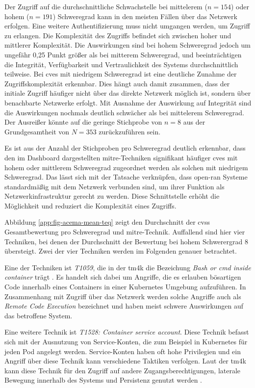 \par Der Zugriff auf die durchschnittliche Schwachstelle bei mittelerem (\(n = 154\)) oder hohem (\(n = 191\)) Schweregrad kann in den meisten Fällen über das Netzwerk erfolgen. Eine weitere Authentifizierung muss nicht umgangen werden, um Zugriff zu erlangen. Die Komplexität des Zugriffs befindet sich zwischen hoher und mittlerer Komplexität. Die Auswirkungen sind bei hohem Schweregrad jedoch um ungefähr 0,25 Punkt größer als bei mitterem Schweregrad, und beeinträchtigen die Integrität, Verfügbarkeit und Vertraulichkeit des Systems durchschnittlich teilweise. Bei \glspl{cve} mit niedrigem Schweregrad ist eine deutliche Zunahme der Zugriffskomplexität erkennbar. Dies hängt auch damit zusammen, dass der initiale Zugriff häufiger nicht über das direkte Netzwerk möglich ist, sondern über benachbarte Netzwerke erfolgt. Mit Ausnahme der Auswirkung auf Integrität sind die Auswirkungen nochmals deutlich schwächer als bei mittelerem Schweregrad. Der Ausreißer könnte auf die geringe Stichprobe von \(n = 8\) aus der Grundgesamtheit von \(N = 353\) zurückzuführen sein.
\par Es ist aus der Anzahl der Stichproben pro Schweregrad deutlich erkennbar, dass den im Dashboard dargestellten \gls{mitre}-Techniken signifikant häufiger \glspl{cve} mit hohem oder mittlerem Schweregrad zugeordnet werden als solchen mit niedrigem Schweregrad. Das lässt sich mit der Tatsache verknüpfen, dass \gls{open-ran} Systeme standardmäßig mit dem Netzwerk verbunden sind, um ihrer Funktion als Netzwerkinfrastruktur gerecht zu werden. Diese Schnittstelle erhöht die Möglichkeit und reduziert die Komplexität eines Zugriffs. 
\par Abbildung \ref{app:fig-acema-mean-teq} zeigt den Durchschnitt der \gls{cvss} Gesamtbewertung pro Schweregrad und \gls{mitre}-Technik. Auffallend sind hier vier Techniken, bei denen der Durchschnitt der Bewertung bei hohem Schwerergrad 8 übersteigt. Zwei der vier Techniken werden im Folgenden genauer betrachtet.
\par Eine der Techniken ist \textit{T1059}, die in der \gls{tm4k} die Bezeichung \textit{Bash or cmd inside container} trägt \autocite{BashCmdContainer}. Es handelt sich dabei um Angriffe, die es erlauben bösartigen Code innerhalb eines Containers in einer Kubernetes Umgebung aufzuführen. In Zusammenhang mit Zugriff über das Netzwerk werden solche Angriffe auch als \textit{Remote Code Execution} bezeichnet und haben meist schwere Auswirkungen auf das betroffene System.
\par Eine weitere Technik ist \textit{T1528: Container service account}. Diese Technik befasst sich mit der Ausnutzung von Service-Konten, die zum Beispiel in Kubernetes für jeden Pod angelegt werden. Service-Konten haben oft hohe Privilegien und ein Angriff über diese Technik kann verschiedene Taktiken verfolgen. Laut der \gls{tm4k} kann diese Technik für den Zugriff auf andere Zugangsberechtigungen, laterale Bewegung innerhalb des Systems und Persistenz genutzt werden \autocite{ContainerServiceAccount}.
